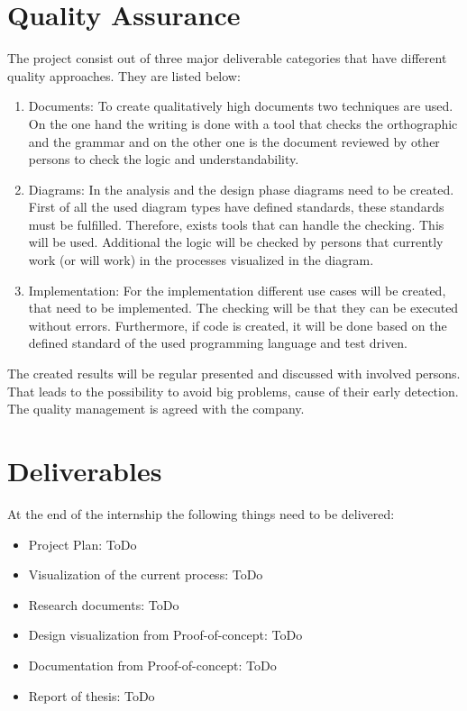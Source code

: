 \section{Quality Assurance}
The project consist out of three major deliverable categories that have different quality approaches. They are listed below:
\begin{enumerate}
	\item Documents: \newline
	To create qualitatively high documents two techniques are used. On the one hand the writing is done with a tool that checks the orthographic and the grammar and on the other one is the document reviewed by other persons to check the logic and understandability. 
	\item Diagrams: \newline
	In the analysis and the design phase diagrams need to be created. First of all the used diagram types have defined standards, these standards must be fulfilled. Therefore, exists tools that can handle the checking. This will be used. Additional the logic will be checked by persons that currently work (or will work) in the processes visualized in the diagram. 
	\item Implementation: \newline
	For the implementation different use cases will be created, that need to be implemented. The checking will be that they can be executed without errors. Furthermore, if code is created, it will be done based on the defined standard of the used programming language and test driven.
\end{enumerate}
The created results will be regular presented and discussed with involved persons. That leads to the possibility to avoid big problems, cause of their early detection. The quality management is agreed with the company. 

\section{Deliverables}
At the end of the internship the following things need to be delivered:
\begin{itemize}
	\item Project Plan: ToDo
	\item Visualization of the current process: ToDo
	\item Research documents: ToDo
	\item Design visualization from Proof-of-concept: ToDo
	\item Documentation from Proof-of-concept: ToDo
	\item Report of thesis: ToDo
\end{itemize}

